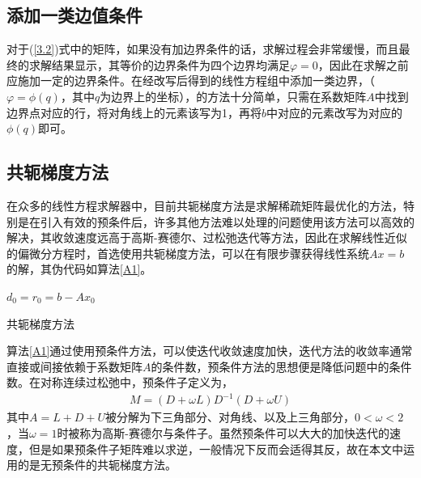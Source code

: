 \documentclass{article} %
\begin{document}
\subsection{添加一类边值条件}
对于(\ref{3.2})式中的矩阵，如果没有加边界条件的话，求解过程会非常缓慢，而且最终的求解结果显示，其等价的边界条件为四个边界均满足$\varphi=0$，因此在求解之前应施加一定的边界条件。在经改写后得到的线性方程组中添加一类边界，（$\varphi=\phi(q)$，其中$q$为边界上的坐标），的方法十分简单，只需在系数矩阵$A$中找到边界点对应的行，将对角线上的元素该写为1，再将$b$中对应的元素改写为对应的$\phi(q)$即可。

\subsection{共轭梯度方法}
在众多的线性方程求解器中，目前共轭梯度方法是求解稀疏矩阵最优化的方法，特别是在引入有效的预条件后，许多其他方法难以处理的问题使用该方法可以高效的解决，其收敛速度远高于高斯-赛德尔、过松弛迭代等方法，因此在求解线性近似的偏微分方程时，首选使用共轭梯度方法，可以在有限步骤获得线性系统$Ax=b$的解，其伪代码如算法\ref{A1}。
\begin{algorithm}
    \LinesNumbered
    $d_0 = r_0 = b-Ax_0$\\
    \caption{共轭梯度方法}
    \label{A1}
\end{algorithm}

算法\ref{A1}通过使用预条件方法，可以使迭代收敛速度加快，迭代方法的收敛率通常直接或间接依赖于系数矩阵$A$的条件数，预条件方法的思想便是降低问题中的条件数。在对称连续过松弛中，预条件子定义为，
\begin{align}
    M=(D+\omega L)D^{-1}(D+\omega U)
\end{align}
其中$A=L+D+U$被分解为下三角部分、对角线、以及上三角部分，$0<\omega<2$，当$\omega = 1$时被称为高斯-赛德尔与条件子。虽然预条件可以大大的加快迭代的速度，但是如果预条件子矩阵难以求逆，一般情况下反而会适得其反，故在本文中运用的是无预条件的共轭梯度方法。
\end{document}
